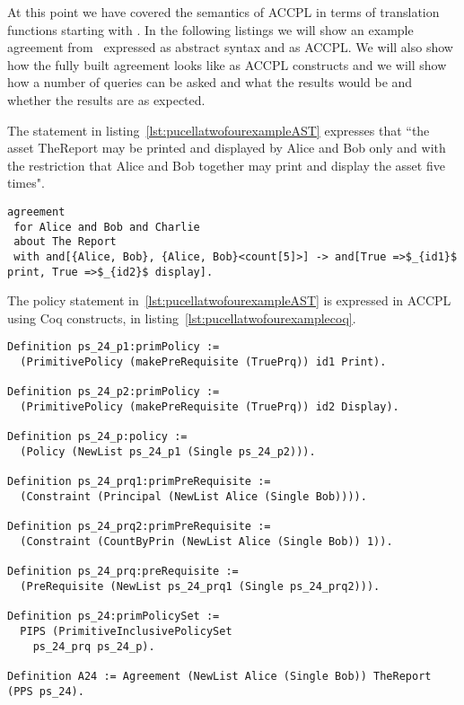 At this point we have covered the semantics of \ac{ACCPL} in terms of translation functions starting with . In the following listings we will show an example agreement from~\cite{pucella2006} expressed as abstract syntax and as \ac{ACCPL}. We will also show how the fully built agreement looks like as \ac{ACCPL} constructs and we will show how a number of queries can be asked and what the results would be and whether the results are as expected.

The statement in listing~\ref{lst:pucellatwofourexampleAST} expresses that ``the asset TheReport may be printed and displayed by Alice and Bob only and with the restriction that Alice and Bob together may print and display the asset five times".

\lstset{language=Pucella2006}
\begin{minipage}[c]{0.95\textwidth}
\begin{lstlisting}[frame=single, caption={Agreement of Example 2.4}, label={lst:pucellatwofourexampleAST}, mathescape]
agreement
 for Alice and Bob and Charlie
 about The Report 
 with and[{Alice, Bob}, {Alice, Bob}<count[5]>] -> and[True =>$_{id1}$ print, True =>$_{id2}$ display].
\end{lstlisting}
\end{minipage} 

The policy statement in~\ref{lst:pucellatwofourexampleAST} is expressed in \ac{ACCPL} using Coq constructs, in listing~\ref{lst:pucellatwofourexamplecoq}.

\begin{minipage}[c]{0.95\textwidth}
\begin{lstlisting}
Definition ps_24_p1:primPolicy := 
  (PrimitivePolicy (makePreRequisite (TruePrq)) id1 Print).

Definition ps_24_p2:primPolicy := 
  (PrimitivePolicy (makePreRequisite (TruePrq)) id2 Display).

Definition ps_24_p:policy := 
  (Policy (NewList ps_24_p1 (Single ps_24_p2))).

Definition ps_24_prq1:primPreRequisite := 
  (Constraint (Principal (NewList Alice (Single Bob)))).

Definition ps_24_prq2:primPreRequisite := 
  (Constraint (CountByPrin (NewList Alice (Single Bob)) 1)).
 
Definition ps_24_prq:preRequisite := 
  (PreRequisite (NewList ps_24_prq1 (Single ps_24_prq2))).

Definition ps_24:primPolicySet :=
  PIPS (PrimitiveInclusivePolicySet
    ps_24_prq ps_24_p).

Definition A24 := Agreement (NewList Alice (Single Bob)) TheReport (PPS ps_24).
\end{lstlisting}
\end{minipage} 

